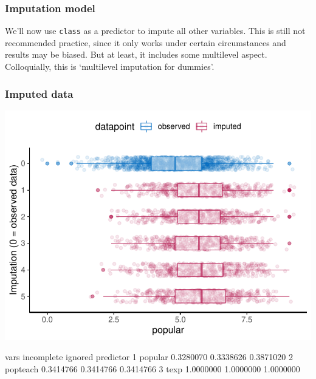 \documentclass[
]{jss}
\begin{document}
\hypertarget{imputation-model-1}{%
\subsubsection{Imputation model}\label{imputation-model-1}}

We'll now use \texttt{class} as a predictor to impute all other
variables. This is still not recommended practice, since it only works
under certain circumstances and results may be biased. But at least, it
includes some multilevel aspect. Colloquially, this is `multilevel
imputation for dummies'.

\begin{CodeChunk}
\end{CodeChunk}

\hypertarget{imputed-data-1}{%
\subsubsection{Imputed data}\label{imputed-data-1}}

\begin{CodeChunk}


\begin{center}\includegraphics{Manuscript_files/figure-latex/pop_predictor_eval-1} \end{center}

\begin{CodeOutput}
      vars incomplete   ignored predictor
1  popular  0.3280070 0.3338626 0.3871020
2 popteach  0.3414766 0.3414766 0.3414766
3     texp  1.0000000 1.0000000 1.0000000
\end{CodeOutput}
\end{CodeChunk}
\end{document}
